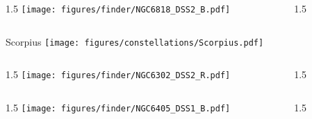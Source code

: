 \documentclass[final]{beamer}
\newlength{\colwidth}
\begin{document}

\begin{frame}[t]{}
  \begin{columns}[T]
    \begin{column}{1.5\colwidth}
      \centering
      \texttt{[image: figures/finder/NGC6818\_DSS2\_B.pdf]}
    \end{column}
    \begin{column}{1.5\colwidth}
      \Large
      
    \end{column}
  \end{columns}
  \vspace{\fill}
\end{frame}


\begin{frame}[t]{\LARGE Scorpius}
  \centering
  \texttt{[image: figures/constellations/Scorpius.pdf]}
\end{frame}


\begin{frame}[t]{}
  \begin{columns}[T]
    \begin{column}{1.5\colwidth}
      \centering
      \texttt{[image: figures/finder/NGC6302\_DSS2\_R.pdf]}
    \end{column}
    \begin{column}{1.5\colwidth}
      \Large
      
    \end{column}
  \end{columns}
  \vspace{\fill}
  \begin{columns}[T]
    \begin{column}{1.5\colwidth}
      \centering
      \texttt{[image: figures/finder/NGC6405\_DSS1\_B.pdf]}
    \end{column}
    \begin{column}{1.5\colwidth}
      \Large
      
    \end{column}
  \end{columns}
\end{frame}
\end{document}

